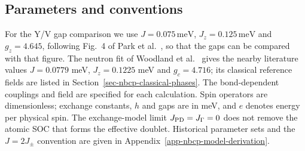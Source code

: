 \subsection{Parameters and conventions}\label{sec-nbcp-model-parameters}

For the Y/V gap comparison we use
\(J=0.075\,\mathrm{meV}\), \(J_z=0.125\,\mathrm{meV}\) and
\(g_z=4.645\), following Fig.~4 of Park et al.~\cite{park2026}, so
that the gaps can be compared with that figure. The neutron fit of
Woodland et al.~\cite{woodland2025} gives the nearby literature values
\(J=0.0779\) meV, \(J_z=0.1225\) meV and \(g_c=4.716\); its classical
reference fields are listed in Section~\ref{sec-nbcp-classical-phases}.
The bond-dependent couplings and field are specified for each calculation.
Spin operators are dimensionless; exchange constants, \(h\) and gaps
are in meV, and \(e\) denotes energy per physical spin.
The exchange-model limit \(J_{\rm PD}=J_\Gamma=0\) does not remove the
atomic SOC that forms the effective doublet.
Historical parameter sets and the \(J=2J_\pm\) convention are given in
Appendix~\ref{app-nbcp-model-derivation}.
